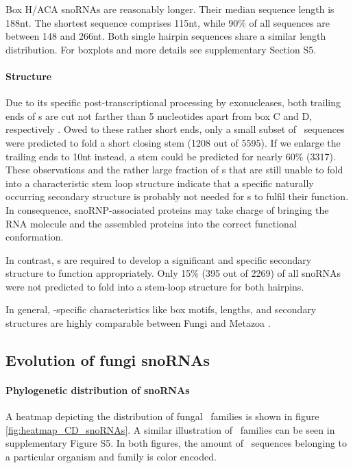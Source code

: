 Box H/ACA snoRNAs are reasonably longer. Their median sequence length
is 188nt. The shortest sequence comprises 115nt, while 90\% of all
sequences are between 148 and 266nt.  Both single hairpin
sequences share a similar length distribution. For boxplots and more details see supplementary Section S5.


\paragraph{\textbf{Structure}} Due to its specific
post-transcriptional processing by exonucleases, both trailing ends of
\cd s are cut not farther than 5 nucleotides apart from box C and D,
respectively \citep{Kishore:2013}. Owed to these rather short ends,
only a small subset of \sno\ sequences were predicted to fold a short
closing stem (1208 out of 5595).  If we enlarge the trailing ends to
10nt instead, a stem could be predicted for nearly 60\% (3317).  These
observations and the rather large fraction of \sno s that are still
unable to fold into a characteristic stem loop structure indicate that
a specific naturally occurring secondary structure is probably not
needed for \cd s to fulfil their function.  In consequence,
snoRNP-associated proteins may take charge of bringing the RNA
molecule and the assembled proteins into the correct functional
conformation.

In contrast, \haca s are required to develop a significant and
specific secondary structure to function appropriately. Only 15\% (395
out of 2269) of all snoRNAs were not predicted to fold into a
stem-loop structure for both hairpins.

In general, \sno -specific characteristics like box motifs, lengths,
and secondary structures are highly comparable between Fungi and
Metazoa \cite{Kehr:2014}.


\subsection{Evolution of fungi snoRNAs}
  
\paragraph{\textbf{Phylogenetic distribution of snoRNAs}}
A heatmap depicting the distribution of fungal \cd\ families is shown
in figure \ref{fig:heatmap_CD_snoRNAs}. A similar illustration of
\haca\ families can be seen in supplementary Figure S5. In both
figures, the amount of \sno\ sequences belonging to a particular
organism and family is color encoded.


